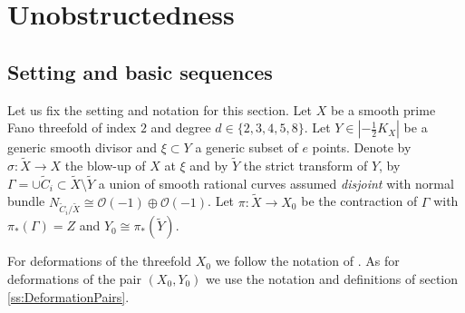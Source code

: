 \documentclass[11pt]{article}
\theoremstyle{definition}
\newcommand{\abs}[1]{\left\vert#1\right\vert}
\newcommand{\OO}{\mathcal{O}}
\begin{document}
\section{Unobstructedness}\label{s:Un}
\subsection{Setting and basic sequences}\label{ss:setting}
Let us fix the setting and notation for this section. Let $X$ be a smooth prime Fano threefold of index $2$ and degree $d\in \{2,3,4,5,8\}$.
Let $Y\in \abs{-\frac{1}{2} K_X}$ be a generic smooth divisor and $\xi\subset Y$ a generic subset of $e$ points.
Denote by $\sigma:\tilde{X}\to X$ the blow-up of $X$ at $\xi$ and by $\tilde{Y}$ the strict transform of $Y$, by $\Gamma=\cup \tilde{C}_i\subset \tilde X\setminus \tilde Y$ a union of smooth rational curves assumed \emph{disjoint} with normal bundle $N_{\tilde C_i/\tilde X}\cong \OO(-1)\oplus \OO(-1)$.
Let $\pi:\tilde{X}\to X_0$ be the contraction of $\Gamma$ with $\pi_*(\Gamma)=Z$ and $Y_0\cong \pi_*(\tilde Y)$.

For deformations of the threefold $X_0$ we follow the notation of \cite{F86}. 
As for deformations of the pair $(X_0,Y_0)$ we use the notation and definitions of section \ref{ss:DeformationPairs}. 
\end{document}
